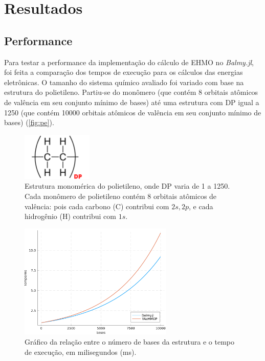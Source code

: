 \chapter{Resultados}

\section{Performance}

Para testar a performance da implementação do cálculo de \gls{EHMO} no \textit{Balmy.jl}, foi feita a comparação dos tempos de execução para os cálculos das energias eletrônicas. O tamanho do sistema químico avaliado foi variado com base na estrutura do polietileno. Partiu-se do monômero (que contém 8 orbitais atômicos de valência em seu conjunto mínimo de bases) até uma estrutura com \gls{DP} igual a 1250 (que contém 10000 orbitais atômicos de valência em seu conjunto mínimo de bases) (\autoref{fig:pe}).

\begin{figure}[htb]
\caption{\label{fig:pe} Estrutura monomérica do polietileno, onde \gls{DP} varia de 1 a 1250. Cada monômero de polietileno contém 8 orbitais atômicos de valência: pois cada carbono (C) contribui com $2s, 2p$, e cada hidrogênio (H) contribui com $1s$.}
	\begin{center}
		\includegraphics[width=0.30\textwidth]{images/aromaticity(2).png}
	\end{center}
\end{figure}

\begin{figure}[htb]
\caption{\label{fig:times} Gráfico da relação entre o número de bases da estrutura e o tempo de execução, em milisegundos (ms).}
	\begin{center}
		\includegraphics[width=0.65\textwidth]{images/tttt.png}
	\end{center}
\end{figure}

